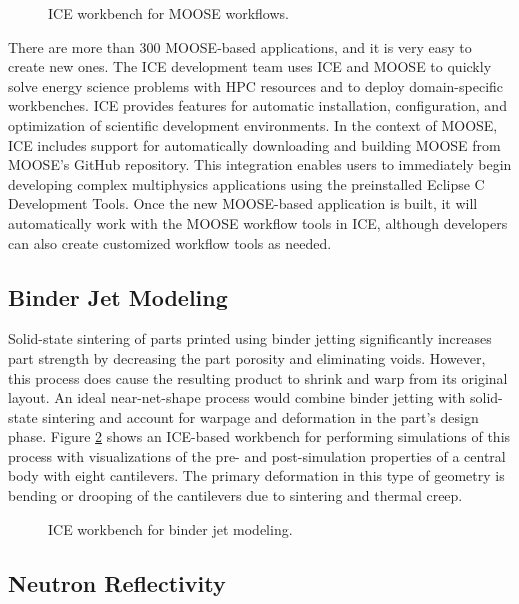 \begin{figure}[htbp]
\centering
{}
\caption{ICE workbench for MOOSE workflows.}
\label{moose}
\end{figure}

There are more than 300 MOOSE-based applications, and it is very easy to create
new ones. The ICE development team uses ICE and MOOSE to quickly solve energy
science problems with HPC resources and to deploy domain-specific workbenches.
ICE provides features for automatic installation, configuration, and
optimization of scientific development environments. In the context of MOOSE,
ICE includes support for automatically downloading and building MOOSE from
MOOSE's GitHub repository. This integration enables users to immediately begin
developing complex multiphysics applications using the preinstalled Eclipse C
Development Tools. Once the new MOOSE-based application is built, it will
automatically work with the MOOSE workflow tools in ICE, although developers can
also create customized workflow tools as needed.

\subsection{Binder Jet Modeling}\label{binder-jet-modeling}

Solid-state sintering of parts printed using binder jetting
significantly increases part strength by decreasing the part porosity
and eliminating voids. However, this process does cause the resulting
product to shrink and warp from its original layout. An ideal near-net-shape 
process would combine binder jetting with solid-state sintering and account
for warpage and deformation in the part's design phase. 
Figure \ref{binder} shows an ICE-based workbench for performing simulations of
this process with visualizations of the pre- and post-simulation
properties of a central body with eight cantilevers. The primary
deformation in this type of geometry is bending or drooping of the
cantilevers due to sintering and thermal creep.

\begin{figure}[H]
\centering
{}
\caption{ICE workbench for binder jet modeling.}
\label{binder}
\end{figure}

\subsection{Neutron Reflectivity}\label{neutron-reflectivity}

